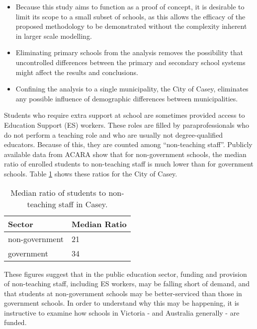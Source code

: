 \documentclass[11pt, a4paper]{article}
\begin{document}
    \begin{itemize}
        \item Because this study aims to function as a proof of concept, it is desirable to limit its scope to a small subset of schools, as this allows the efficacy of the proposed methodology to be demonstrated without the complexity inherent in larger scale modelling.
        \item Eliminating primary schools from the analysis removes the possibility that uncontrolled differences between the primary and secondary school systems might affect the results and conclusions.
        \item Confining the analysis to a single municipality, the City of Casey, eliminates any possible influence of demographic differences between municipalities.  
    \end{itemize}

    Students who require extra support at school are sometimes provided access to Education Support (ES) workers. These roles are filled by paraprofessionals who do not perform a teaching role and who are usually not degree-qualified educators. Because of this, they are counted among ``non-teaching staff''. Publicly available data from ACARA \parencite{acara_profiles} show that for non-government schools, the median ratio of enrolled students to non-teaching staff is much lower than for government schools. Table \ref{es_staff_ratios} shows these ratios for the City of Casey.

    \begin{table}[!ht]
        \centering
        \caption{Median ratio of students to non-teaching staff in Casey.}
        \begin{tabular}{|l|l|}
            \hline
            Sector          & Median Ratio  \\ \hline
            non-government  & 21            \\ \hline
            government      & 34            \\ \hline
        \end{tabular}
        \label{es_staff_ratios}
    \end{table}

    These figures suggest that in the public education sector, funding and provision of non-teaching staff, including ES workers, may be falling short of demand, and that students at non-government schools may be better-serviced than those in government schools. In order to understand why this may be happening, it is instructive to examine how schools in Victoria - and Australia generally - are funded.
\end{document}
